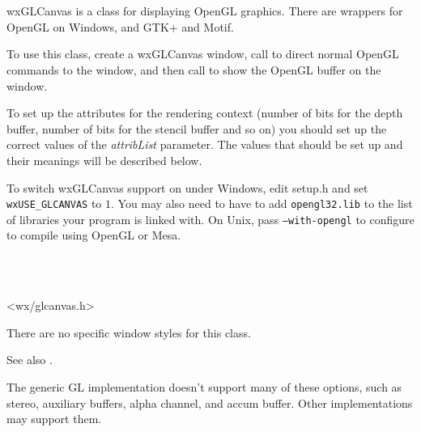 \section{}\label{wxglcanvas}

wxGLCanvas is a class for displaying OpenGL graphics. There are
wrappers for OpenGL on Windows, and GTK+ and Motif.

To use this class, create a wxGLCanvas window, call  
to direct normal OpenGL commands to the window, and then call  
to show the OpenGL buffer on the window.

To set up the attributes for the rendering context (number of bits for the depth buffer,
number of bits for the stencil buffer and so on) you should set up the correct values of
the {\it attribList} parameter. The values that should be set up and their meanings will be described below.

To switch wxGLCanvas support on under Windows, edit setup.h and set
{\tt wxUSE\_GLCANVAS} to $1$. You may also need to have to add
{\tt opengl32.lib} to the list of libraries your program is linked with. On
Unix, pass {\tt --with-opengl} to configure to compile using OpenGL or Mesa.


\\
\\


<wx/glcanvas.h>


There are no specific window styles for this class.

See also .


The generic GL implementation doesn't support many of these options, such as stereo, auxiliary buffers,
alpha channel, and accum buffer. Other implementations may support them.

